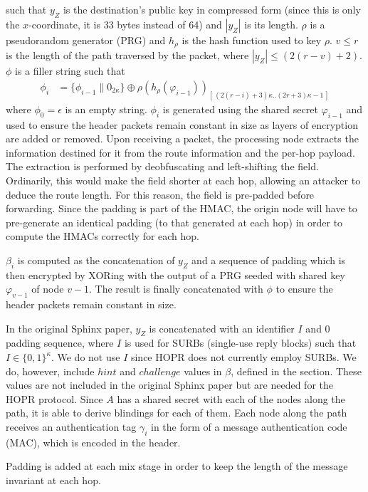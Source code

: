 such that $y_Z$ is the destination's public key in compressed form (since this is only the $x$-coordinate, it is 33 bytes instead of 64) and $|y_Z|$ is its length. $\rho$ is a pseudorandom generator (PRG) and $h_{\rho}$ is the hash function used to key $\rho$.
$v\leq r$ is the length of the path traversed by the packet, where $|y_Z| \leq (2(r - v) + 2)$. $\phi$ is a filler string such that
\begin{align}
    \phi_i & =\{ \phi_{i-1}\|0_{2\kappa}\}\oplus \rho(h_{\rho}(\varphi_{i-1}))_{[ \,(2(r-i)+3)\kappa..(2r+3)\kappa-1\,]}
\end{align}
where $\phi_0=\epsilon$ is an empty string. $\phi_i$ is generated using the shared secret $\varphi_{i-1}$ and used to ensure the header packets remain constant in size as layers of encryption are added or removed. Upon receiving a packet, the processing node extracts the information destined for it from the route information and the per-hop payload. The extraction is performed by deobfuscating and left-shifting the field. Ordinarily, this would make the field shorter at each hop, allowing an attacker to deduce the route length. For this reason, the field is pre-padded before forwarding. Since the padding is part of the HMAC, the origin node will have to pre-generate an identical padding (to that generated at each hop) in order to compute the HMACs correctly for each hop.

$\beta_i$ is computed as the concatenation of $y_Z$ and a sequence of padding which is then encrypted by XORing with the output of a PRG seeded with shared key $\varphi_{v-1}$ of node $v-1$. The result is finally concatenated with $\phi$ to ensure the header packets remain constant in size.

In the original Sphinx paper, $y_Z$ is concatenated with an identifier $I$ and $0$ padding sequence, where $I$ is used for SURBs (single-use reply blocks) such that $I \in \{0, 1\}^\kappa$. We do not use $I$ since HOPR does not currently employ SURBs. We do, however, include $hint$ and $challenge$ values in $\beta$, defined in the  section. These values are not included in the original Sphinx paper but are needed for the HOPR protocol. Since $A$ has a shared secret with each of the nodes along the path, it is able to derive blindings for each of them. Each node along the path receives an authentication tag $\gamma_i$ in the form of a message authentication code (MAC), which is encoded in the header.

Padding is added at each mix stage in order to keep the length of the message invariant at each hop.

